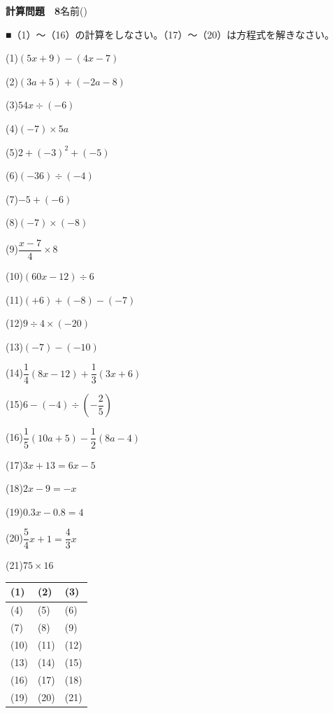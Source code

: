\documentclass[a4paper,11pt]{ltjsarticle}
\newlength{\qcol}\setlength{\qcol}{0.47\textwidth}
\newlength{\qgap}
\newlength{\anscolw}\setlength{\anscolw}{0.30\textwidth}
\newlength{\ansh}
\newcommand{\Q}[2]{\parbox[t]{\qcol}{\raggedright (#1)\hspace{0.6em}$\displaystyle #2$}}
\newcommand{\QR}[4]{\Q{#1}{#2}\hfill\Q{#3}{#4}\par\vspace{\qgap}}
\newcommand{\anscell}[1]{\rule[-\ansdrop]{0pt}{\ansh}(#1)}
\newlength{\ansdrop}
\begin{document}
{\large\bfseries 計算問題　8}\hfill 名前(\underline{\hspace{32mm}})\par\vspace{3mm}
■（1）〜（16）の計算をしなさい。（17）〜（20）は方程式を解きなさい。\par\vspace{3mm}
\setlength{\qgap}{5.4mm}
\QR{1}{(5x+9)-(4x-7)}{2}{(3a+5)+(-2a-8)}
\QR{3}{54x\div(-6)}{4}{(-7)\times5a}
\QR{5}{2+(-3)^2+(-5)}{6}{(-36)\div(-4)}
\QR{7}{-5+(-6)}{8}{(-7)\times(-8)}
\QR{9}{\dfrac{x-7}{4}\times8}{10}{(60x-12)\div6}
\QR{11}{(+6)+(-8)-(-7)}{12}{9\div4\times(-20)}
\QR{13}{(-7)-(-10)}{14}{\dfrac{1}{4}(8x-12)+\dfrac{1}{3}(3x+6)}
\QR{15}{6-(-4)\div\left(-\dfrac{2}{5}\right)}{16}{\dfrac{1}{5}(10a+5)-\dfrac{1}{2}(8a-4)}
\QR{17}{3x+13=6x-5}{18}{2x-9=-x}
\QR{19}{0.3x-0.8=4}{20}{\dfrac{5}{4}x+1=\dfrac{4}{3}x}
\vspace{1mm}
\Q{21}{75\times16}\par\vspace{3mm}
\setlength{\ansh}{9.5mm}\setlength{\ansdrop}{6mm}%
\begin{center}\begin{tabular}{|p{\anscolw}|p{\anscolw}|p{\anscolw}|}\hline
\anscell{1} & \anscell{2} & \anscell{3} \\\hline
\anscell{4} & \anscell{5} & \anscell{6} \\\hline
\anscell{7} & \anscell{8} & \anscell{9} \\\hline
\anscell{10} & \anscell{11} & \anscell{12} \\\hline
\anscell{13} & \anscell{14} & \anscell{15} \\\hline
\anscell{16} & \anscell{17} & \anscell{18} \\\hline
\anscell{19} & \anscell{20} & \anscell{21} \\\hline
\end{tabular}\end{center}
\end{document}
